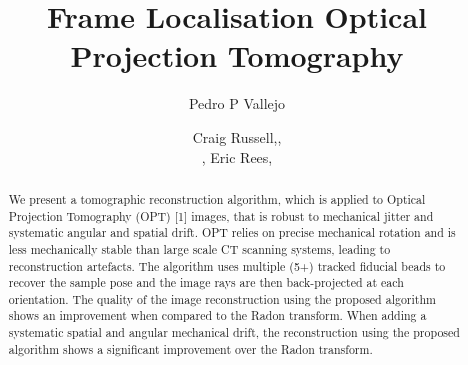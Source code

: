 \documentclass{osa-article}
\begin{document}
\title{Frame Localisation Optical Projection Tomography}

\author{Craig Russell,, \author{Pedro P Vallejo}, Eric Rees,}

\address{Department of Chemical Engineering and Biotechnology, University of Cambridge,}
\address{National Physical Laboratory, }


\begin{abstract}
  We present a tomographic reconstruction algorithm, which is applied to Optical Projection Tomography (OPT) [1] images, that is robust to mechanical jitter and systematic angular and spatial drift.
  OPT relies on precise mechanical rotation and is less mechanically stable than large scale CT scanning systems, leading to reconstruction artefacts.
  The algorithm uses multiple (5+) tracked fiducial beads to recover the sample pose and the image rays are then back-projected at each orientation.
  The quality of the image reconstruction using the proposed algorithm shows an improvement when compared to the Radon transform.
  When adding a systematic spatial and angular mechanical drift, the reconstruction using the proposed algorithm shows a significant improvement over the Radon transform.
\end{abstract}




%
\end{document}
